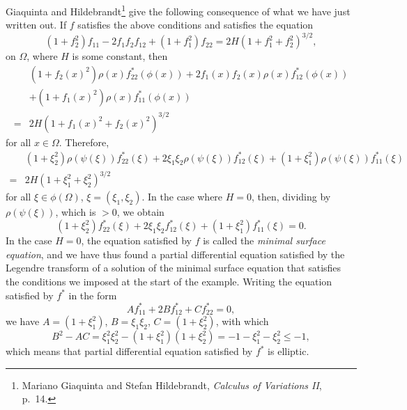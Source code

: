 \documentclass{article}
\theoremstyle{definition}
\begin{document}
Giaquinta and Hildebrandt\footnote{Mariano
Giaquinta and Stefan Hildebrandt, {\em Calculus of Variations II}, p.~14.} give the following consequence of what we have just written out.
If $f$ satisfies the above conditions and satisfies  the equation
\[
(1+f_2^2)f_{11} - 2f_1 f_2 f_{12} + (1+f_1^2)f_{22} = 2H(1+f_1^2+f_2^2)^{3/2},
\]
on $\Omega$, where $H$ is some constant, then 
\[
\begin{split}
&(1+f_2(x)^2) \rho(x) f^*_{22}(\phi(x))+2f_1(x)f_2(x)\rho(x)f^*_{12}(\phi(x))\\
&+(1+f_1(x)^2)\rho(x)f^*_{11}(\phi(x))\\
=&2H(1+f_1(x)^2+f_2(x)^2)^{3/2}
\end{split}
\]
for all $x \in \Omega$. Therefore,
\[
\begin{split}
&(1+\xi_2^2) \rho(\psi(\xi)) f^*_{22}(\xi) + 2\xi_1\xi_2 \rho(\psi(\xi)) f^*_{12}(\xi) +(1+\xi_1^2)\rho(\psi(\xi)) f^*_{11}(\xi)\\
=&2H(1+\xi_1^2+\xi_2^2)^{3/2}
\end{split}
\]
for all $\xi \in \phi(\Omega)$, $\xi=(\xi_1,\xi_2)$. In the case where $H=0$, then, dividing by $\rho(\psi(\xi))$, which is $>0$, we obtain
\[
(1+\xi_2^2) f^*_{22}(\xi) + 2\xi_1\xi_2  f^*_{12}(\xi) +(1+\xi_1^2) f^*_{11}(\xi)=0.
\]
In the case $H=0$, the equation satisfied by $f$ is called the {\em minimal surface equation}, and we have thus found a partial
differential equation satisfied by 
the Legendre transform of a solution of the minimal surface equation that satisfies the conditions we imposed at the start of the example.
Writing the equation satisfied by $f^*$ in the form
\[
A f^*_{11} + 2Bf^*_{12}+Cf^*_{22}=0,
\]
we have $A=(1+\xi_1^2)$, $B=\xi_1\xi_2$, $C=(1+\xi_2^2)$, with which
\[
B^2-AC = \xi_1^2\xi_2^2-(1+\xi_1^2)(1+\xi_2^2)=-1-\xi_1^2-\xi_2^2 \leq -1,
\]
which means that partial differential equation satisfied by $f^*$ is elliptic.
\end{document}

